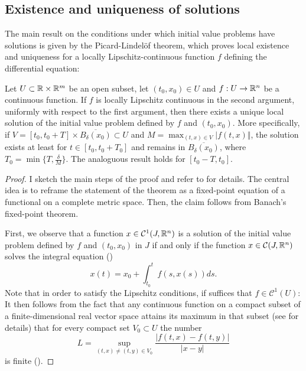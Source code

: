 \subsection{Existence and uniqueness of solutions}

The main result on the conditions under which initial value problems have solutions is given by the Picard-Lindelöf theorem, which proves local existence and uniqueness for a locally Lipschitz-continuous function $f$ defining the differential equation: 

\begin{theorem}\label{thm:picard-lindelöf} Let $U\subset \mathbb{R}\times \mathbb{R}^m$ be an open subset, let $(t_0,x_0)\in U$ and $f:U\to\mathbb{R}^n$ be a continuous function. If $f$ is locally Lipschitz continuous in the second argument, uniformly with respect to the first argument, then there exists a unique local solution of the initial value problem defined by $f$ and $(t_0,x_0)$. More specifically, if $V = [t_0,t_0 + T]\times \overline{B_{\delta}(x_0)} \subset U$ and $M = \max_{(t,x)\in V} \vert f(t,x)\Vert$, the solution exists at least for $t\in [t_0,t_0 + T_0]$ and remains in $\overline{B_{\delta}(x_0)}$, where $T_0 = \min\lbrace T,\frac{\delta}{M}\rbrace$. The analoguous result holds for $[t_0-T,t_0]$.
	\begin{proof}
		I sketch the main steps of the proof and refer to \cite[pp.~36-38]{Teschl2012} for details. 
	 	The central idea is to reframe the statement of the theorem as a fixed-point equation of a functional on a complete metric space. Then, the claim follows from Banach's fixed-point theorem. 
	 	
		First, we observe that a function $x\in\mathcal{C}^1(J,\mathbb{R}^n)$ is a solution of the initial value problem defined by $f$ and $(t_0,x_0)$ in $J$ if and only if the function $x\in\mathcal{C}(J,\mathbb{R}^n)$ solves the integral equation (\cite[p.~36]{Teschl2012})
		$$	x(t) = x_0 + \int_{t_0}^{t} f(s,x(s)) ds.$$ 		
		Note that in order to satisfy the Lipschitz conditions, if suffices that $f\in \mathcal{C}^1(U)$: It then follows from the fact that any continuous function on a compact subset of a finite-dimensional real vector space attains its maximum in that subset (see \cite[p.~71f.]{Perko2001} for details) that for every compact set $V_0\subset U$ the number 
		$$ L = \sup_{(t,x)\neq(t,y)\in V_0} \frac{\vert f(t,x) - f(t,y) \vert}{\vert x-y\vert} $$
		is finite (\cite[p.~37]{Teschl2012}). 
		

\end{proof}
\end{theorem}
